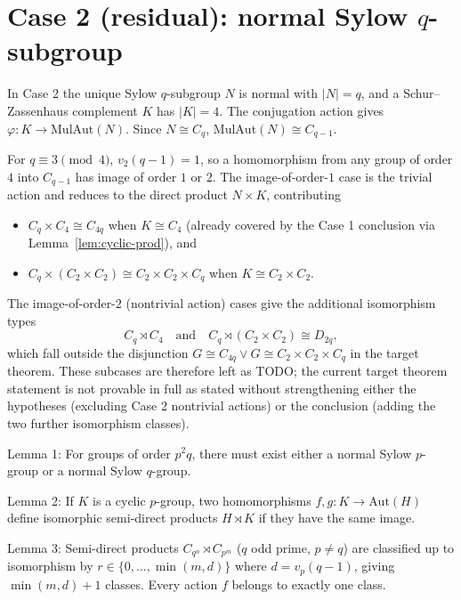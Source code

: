 \section{Case 2 (residual): normal Sylow $q$-subgroup}

In Case 2 the unique Sylow $q$-subgroup $N$ is normal with $|N| = q$, and a
Schur--Zassenhaus complement $K$ has $|K| = 4$. The conjugation action gives
$\varphi : K \to \mathrm{MulAut}(N)$. Since $N \cong C_q$,
$\mathrm{MulAut}(N) \cong C_{q-1}$.

For $q \equiv 3 \pmod 4$, $v_2(q-1) = 1$, so a homomorphism from any group of
order $4$ into $C_{q-1}$ has image of order $1$ or $2$. The image-of-order-$1$
case is the trivial action and reduces to the direct product
$N \times K$, contributing
\begin{itemize}
    \item $C_q \times C_4 \cong C_{4q}$ when $K \cong C_4$ (already covered by
        the Case 1 conclusion via Lemma~\ref{lem:cyclic-prod}), and
    \item $C_q \times (C_2 \times C_2) \cong C_2 \times C_2 \times C_q$ when
        $K \cong C_2 \times C_2$.
\end{itemize}

The image-of-order-$2$ (nontrivial action) cases give the additional
isomorphism types
\[
    C_q \rtimes C_4 \quad \text{and} \quad C_q \rtimes (C_2 \times C_2) \cong D_{2q},
\]
which fall outside the disjunction $G \cong C_{4q} \lor G \cong C_2 \times
C_2 \times C_q$ in the target theorem. These subcases are therefore left as
TODO; the current target theorem statement is not provable in full as stated
without strengthening either the hypotheses (excluding Case 2 nontrivial
actions) or the conclusion (adding the two further isomorphism classes).




Lemma 1: For groups of order $p^2 q$, there must exist either a normal Sylow $p$-group or a normal Sylow $q$-group.

Lemma 2: If $K$ is a cyclic $p$-group, two homomorphisms $f, g : K → \text{Aut}(H)$ define
isomorphic semi-direct products $H \rtimes K$ if they have the same image.

Lemma 3: Semi-direct products $C_{q^n} ⋊ C_{p^m}$ ($q$ odd prime, $p ≠ q$) are classified up to
isomorphism by $r ∈ \{0, …, \min(m, d)\}$ where $d = v_p(q - 1)$, giving $\min(m, d) + 1$ classes. Every action $f$ belongs to exactly one class.

